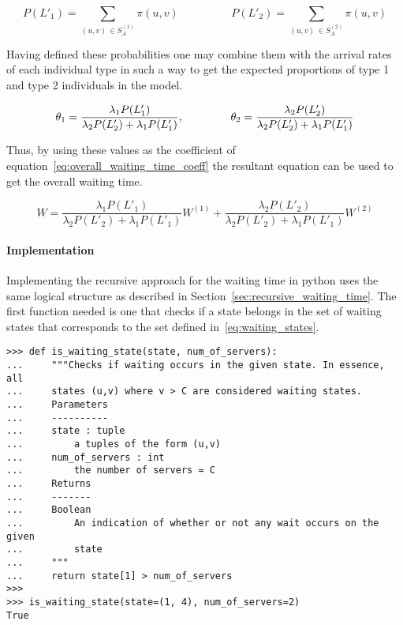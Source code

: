 \begin{equation*}
    P(L'_1) = \sum_{(u,v) \, \in S_A^{(1)}} \pi(u,v) \hspace{2cm}
    P(L'_2) = \sum_{(u,v) \, \in S_A^{(2)}} \pi(u,v)
\end{equation*}


Having defined these probabilities one may combine them with the arrival rates
of each individual type in such a way to get the expected proportions of type 1
and type 2 individuals in the model.

\begin{equation}
    \theta_1 = \frac{\lambda_1 P(L'_1)}{\lambda_2 P(L'_2) + \lambda_1 P(L'_1)},
    \hspace{1.5cm}
    \theta_2 = \frac{\lambda_2 P(L'_2)}{\lambda_2 P(L'_2) + \lambda_1 P(L'_1)}
\end{equation}

Thus, by using these values as the coefficient of
equation~\eqref{eq:overall_waiting_time_coeff}
the resultant equation can be used to get the overall waiting time.

\begin{equation}\label{eq:overall_waiting_time}
    W = \frac{\lambda_1 P(L'_1)}{\lambda_2 P(L'_2) + \lambda_1 P(L'_1)} W^{(1)}
    + \frac{\lambda_2 P(L'_2)}{\lambda_2 P(L'_2) + \lambda_1 P(L'_1)} W^{(2)}
\end{equation}


\paragraph{Implementation}\label{sec:waiting_recursive_implementation}

Implementing the recursive approach for the waiting time in python uses the
same logical structure as described in Section~\ref{sec:recursive_waiting_time}.
The first function needed is one that checks if a state belongs in the
set of waiting states that corresponds to the set defined
in~\eqref{eq:waiting_states}.

\begin{lstlisting}[style=pystyle]
>>> def is_waiting_state(state, num_of_servers):
...     """Checks if waiting occurs in the given state. In essence, all
...     states (u,v) where v > C are considered waiting states.
...     Parameters
...     ----------
...     state : tuple
...         a tuples of the form (u,v)
...     num_of_servers : int
...         the number of servers = C
...     Returns
...     -------
...     Boolean
...         An indication of whether or not any wait occurs on the given
...         state
...     """
...     return state[1] > num_of_servers
>>>
>>> is_waiting_state(state=(1, 4), num_of_servers=2)
True

\end{lstlisting}

